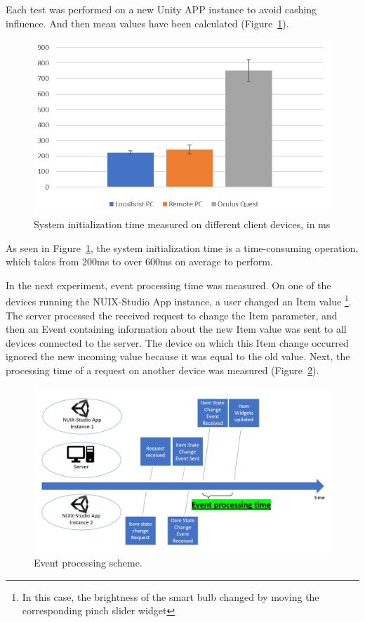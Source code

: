 Each test was performed on a new Unity APP instance to avoid cashing influence. And then mean values have been calculated (Figure~\ref{fig:SystemInitTime-figure}).

\begin{figure}
  \centering
  \includegraphics[width=0.9\linewidth]{figures/SystemInitTime.png}
  \caption{System initialization time measured on different client devices, in ms}
  \label{fig:SystemInitTime-figure}
\end{figure}

As seen in Figure~\ref{fig:SystemInitTime-figure}, the system initialization time is a time-consuming operation, which takes from 200ms to over 600ms on average to perform.

In the next experiment, event processing time was measured. On one of the devices running the NUIX-Studio App instance, a user changed an Item value \footnote{In this case, the brightness of the smart bulb changed by moving the corresponding pinch slider widget}. The server processed the received request to change the Item parameter, and then an Event containing information about the new Item value was sent to all devices connected to the server. The device on which this Item change occurred ignored the new incoming value because it was equal to the old value. Next, the processing time of a request on another device was measured (Figure~\ref{fig:EventProcessingScheme-figure}).

\begin{figure}
  \centering
  \includegraphics[width = 0.9 \linewidth]{figures/EventProcessingScheme.png}
  \caption{Event processing scheme.}
  \label{fig:EventProcessingScheme-figure}
\end{figure}

